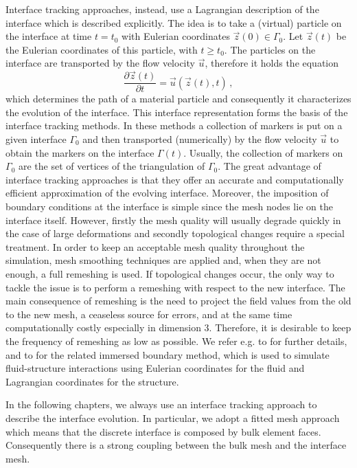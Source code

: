 Interface tracking approaches, instead, use a Lagrangian description of the
interface which is described explicitly. The idea is to take a (virtual)
particle on the interface at time $t=t_0$ with Eulerian coordinates $\vec z(0)
\in \Gamma_0$. Let $\vec z(t)$ be the Eulerian coordinates of this particle,
with $t\geq t_0$. The particles on the interface are transported by the flow
velocity $\vec u$, therefore it holds the equation
\begin{equation}
\frac{\partial \vec z(t)}{\partial t}=\vec u(\vec z(t),t)\,,
\end{equation}
which determines the path of a material particle and consequently it
characterizes the evolution of the interface. This interface representation
forms the basis of the interface tracking methods. In these methods a
collection of markers is put on a given interface $\Gamma_0$ and then
transported (numerically) by the flow velocity $\vec u$ to obtain the markers
on the interface $\Gamma(t)$. Usually, the collection of markers on $\Gamma_0$
are the set of vertices of the triangulation of $\Gamma_0$. The great
advantage of interface tracking approaches is that they offer an accurate and
computationally efficient approximation of the evolving interface. Moreover,
the imposition of boundary conditions at the interface is simple since the mesh
nodes lie on the interface itself. However, firstly the mesh quality will
usually degrade quickly in the case of large deformations and secondly
topological changes require a special treatment. In order to keep an
acceptable mesh quality throughout the simulation, mesh smoothing techniques
are applied and, when they are not enough, a full remeshing is used. If
topological changes occur, the only way to tackle the issue is to
perform a remeshing with respect to the new interface. The main consequence of
remeshing is the need to project the field values from the old to the new
mesh, a ceaseless source for errors, and at the same time computationally
costly especially in dimension 3. Therefore, it is desirable to keep the
frequency of remeshing as low as possible. We refer e.g. to
\cite{UnverdiT92,Bansch01,Tryggvason_etal01,GanesanMT07,GanesanT08,spurious,
fluidfbp} for further details, and to \cite{LevequeL97,Peskin02} for the
related immersed boundary method, which is used to simulate fluid-structure
interactions using Eulerian coordinates for the fluid and Lagrangian
coordinates for the structure.

In the following chapters, we always use an interface tracking approach to
describe the interface evolution. In particular, we adopt a fitted mesh approach
which means that the discrete interface is composed by bulk element faces.
Consequently there is a strong coupling between the bulk mesh and the interface
mesh.

